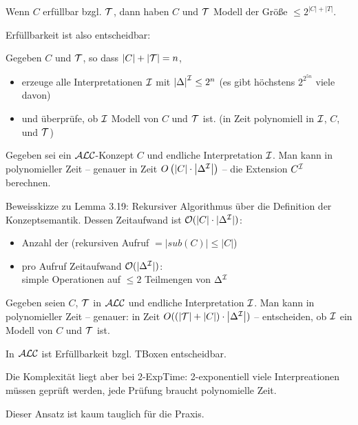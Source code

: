 Wenn $C$ erfüllbar bzgl. $\mathcal{T}$, dann haben $C$ und $\mathcal{T}$ Modell der
Größe $\leq 2^{\left| C \right| + \left| T \right|}$.

Erfüllbarkeit ist also entscheidbar:

Gegeben $C$ und $\mathcal{T}$, so dass $|C|+|\mathcal{T}| = n$,
\begin{itemize} 
  \item erzeuge alle Interpretationen $\mathcal{I}$ mit $\left| \Delta \right|^{\mathcal{I}} \leq 2^{n}$ (es gibt höchstens $2^{2^{5n}}$ viele davon) 
  \item und überprüfe, ob $\mathcal{I}$ Modell von $C$ und $\mathcal{T}$ ist. (in Zeit polynomiell in $\mathcal{I}$, $C$, und $\mathcal{T}$)
\end{itemize}

\begin{lemma}
Gegeben sei ein $\mathcal{A}\mathcal{L}\mathcal{C}$-Konzept $C$ und endliche Interpretation $\mathcal{I}$. Man kann in polynomieller Zeit -- genauer in Zeit $O\left( \left| C \right| \cdot \left| \Delta^{\mathcal{I}} \right| \right)$ -- die Extension $C^{\mathcal{I}}$ berechnen.
\end{lemma}

Beweisskizze zu Lemma 3.19: Rekursiver Algorithmus über die Definition der Konzeptsemantik. Dessen Zeitaufwand ist $\mathcal{O}(|C| \cdot |\Delta^{\mathcal{I}}|)$:

\begin{itemize}
  \item Anzahl der (rekursiven Aufruf $= |sub(C)| \leq |C|$)
  \item pro Aufruf Zeitaufwand $\mathcal{O}(|\Delta^{\mathcal{I}}|)$: \\
  simple Operationen auf $\leq 2$ Teilmengen von $\Delta^{\mathcal{I}}$
\end{itemize}

\begin{korollar}
Gegeben seien $C$, $\mathcal{T}$ in $\mathcal{A}\mathcal{L}\mathcal{C}$ und endliche Interpretation $\mathcal{I}$. Man kann in polynomieller Zeit -- genauer: in Zeit $O(\left( \left| \mathcal{T} \right| + \left| C \right| \right) \cdot \left| \Delta^{\mathcal{I}} \right|)$ -- entscheiden, ob $\mathcal{I}$ ein Modell von $C$ und $\mathcal{T}$ ist.
\end{korollar}

\begin{theorem}
In $\mathcal{A}\mathcal{L}\mathcal{C}$ ist Erfüllbarkeit bzgl. TBoxen entscheidbar.
\end{theorem}

Die Komplexität liegt aber bei 2-ExpTime: 2-exponentiell viele Interpreationen müssen geprüft werden, jede Prüfung braucht polynomielle Zeit.

Dieser Ansatz ist kaum tauglich für die Praxis.